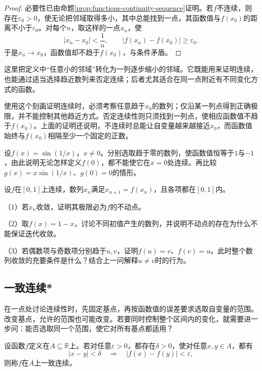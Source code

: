 \begin{proof}
必要性已由命题\ref{prop:functions-continuity-sequence}证明。若\(f\)不连续，则存在\(\varepsilon_0>0\)，使无论把邻域取得多小，其中总能找到一点，其函数值与\(f(x_0)\)的距离不小于\(\varepsilon_0\)。对每个\(n\)，取这样的一点\(x_n\)，使
\begin{equation*}
 |x_n-x_0|<\frac1n,\qquad
 |f(x_n)-f(x_0)|\ge\varepsilon_0.
\end{equation*}
于是\(x_n\to x_0\)，函数值却不趋于\(f(x_0)\)，与条件矛盾。
\end{proof}

这里把定义中“任意小的邻域”转化为一列逐步缩小的邻域。它既能用来证明连续，也能通过适当选择趋近数列来否定连续；后者尤其适合在同一点附近有不同变化方式的函数。

使用这个刻画证明连续时，必须考察任意趋于\(x_0\)的数列；仅沿某一列点得到正确极限，并不能控制其他趋近方式。否定连续性则只须找到一列点，使相应函数值不趋于\(f(x_0)\)。上面的证明还说明，不连续时总能让自变量越来越接近\(x_0\)，而函数值始终与\(f(x_0)\)相隔至少一个固定的正数。

\begin{example}
设\(f(x)=\sin(1/x)\)，\(x\ne0\)。分别选取趋于零的数列，使函数值恒等于\(1\)与\(-1\)，由此说明无论怎样定义\(f(0)\)，都不能使它在\(x=0\)处连续。再比较\(g(x)=x\sin(1/x)\)、\(g(0)=0\)的情形。
\end{example}

\begin{exercise}
设\(f\)在\([0,1]\)上连续，数列\(x_n\)满足\(x_{n+1}=f(x_n)\)，且各项都在\([0,1]\)内。

（1）若\(x_n\)收敛，证明其极限必为\(f\)的不动点。

（2）取\(f(x)=1-x\)，讨论不同初值产生的数列，并说明不动点的存在为什么不能保证迭代收敛。

（3）若偶数项与奇数项分别趋于\(u,v\)，证明\(f(u)=v\)、\(f(v)=u\)。此时整个数列收敛的充要条件是什么？结合上一问解释\(u\ne v\)时的行为。
\end{exercise}

\subsection{一致连续*}
\label{subsec:functions-uniform-continuity}

在一点处讨论连续性时，先固定基点，再按函数值的误差要求选取自变量的范围。改变基点，允许的范围也可能改变。若要同时控制整个区间内的变化，就需要进一步问：能否选取同一个范围，使它对所有基点都适用？

\begin{definition}
设函数\(f\)定义在\(A\subseteq\mathbb R\)上。若对任意\(\varepsilon>0\)，都存在\(\delta>0\)，使对任意\(x,y\in A\)，都有
\begin{equation*}
 |x-y|<\delta\quad\Longrightarrow\quad|f(x)-f(y)|<\varepsilon,
\end{equation*}
则称\(f\)在\(A\)上{\heiti{}一致连续}。
\end{definition}

